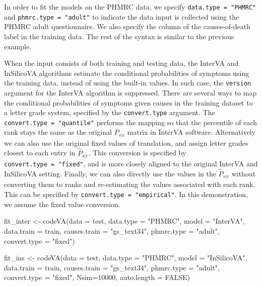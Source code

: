 In order to fit the models on the PHMRC data, we specify
\texttt{data.type\ =\ "PHMRC"} and \texttt{phmrc.type\ =\ "adult"} to
indicate the data input is collected using the PHMRC adult
questionnaire. We also specify the column of the causes-of-death label
in the training data. The rest of the syntax is similar to the previous
example.

When the input consists of both training and testing data, the InterVA
and InSilicoVA algorithms estimate the conditional probabilities of
symptoms using the training data, instead of using the built-in values.
In such case, the \texttt{version} argument for the InterVA algorithm is
suppressed. There are several ways to map the conditional probabilities
of symptoms given causes in the training dataset to a letter grade
system, specified by the \texttt{convert.type} argument. The
\texttt{convert.type\ =\ "quantile"} performs the mapping so that the
percentile of each rank stays the same as the original \(P_{s|c}\)
matrix in InterVA software. Alternatively we can also use the original
fixed values of translation, and assign letter grades closest to each
entry in \(\hat{P}_{s|c}\). This conversion is specified by
\texttt{convert.type\ =\ "fixed"}, and is more closely aligned to the
original InterVA and InSilicoVA setting. Finally, we can also directly
use the values in the \(\hat{P}_{s|c}\) without converting them to ranks
and re-estimating the values associated with each rank. This can be
specified by \texttt{convert.type\ =\ "empirical"}. In this
demonstration, we assume the fixed value conversion.

\begin{Schunk}
\begin{Sinput}
fit_inter <- codeVA(data = test, data.type = "PHMRC", model = "InterVA", 
                     data.train = train, causes.train = "gs_text34", 
                     phmrc.type = "adult", convert.type = "fixed")
\end{Sinput}
\end{Schunk}

\begin{Schunk}
\begin{Sinput}
fit_ins <- codeVA(data = test, data.type = "PHMRC", model = "InSilicoVA",
                    data.train = train, causes.train = "gs_text34", 
                    phmrc.type = "adult", convert.type = "fixed", 
                    Nsim=10000, auto.length = FALSE)
\end{Sinput}
\end{Schunk}

